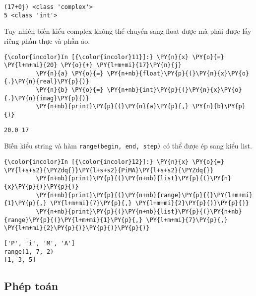     \begin{Verbatim}[commandchars=\\\{\}]
(17+0j) <class 'complex'>
5 <class 'int'>

    \end{Verbatim}

    Tuy nhiên biến kiểu complex không thể chuyển sang float được mà phải
được lấy riêng phần thực và phần ảo.

    
\begin{Verbatim}[commandchars=\\\{\}]
{\color{incolor}In [{\color{incolor}11}]:} \PY{n}{x} \PY{o}{=} \PY{l+m+mi}{20} \PY{o}{+} \PY{l+m+mi}{17}\PY{n}{j}
         \PY{n}{a} \PY{o}{=} \PY{n+nb}{float}\PY{p}{(}\PY{n}{x}\PY{o}{.}\PY{n}{real}\PY{p}{)}
         \PY{n}{b} \PY{o}{=} \PY{n+nb}{int}\PY{p}{(}\PY{n}{x}\PY{o}{.}\PY{n}{imag}\PY{p}{)}
         \PY{n+nb}{print}\PY{p}{(}\PY{n}{a}\PY{p}{,} \PY{n}{b}\PY{p}{)}
\end{Verbatim}
    

    \begin{Verbatim}[commandchars=\\\{\}]
20.0 17

    \end{Verbatim}

    Biến kiểu string và hàm \texttt{range(begin,\ end,\ step)} có thể được
ép sang kiểu list.

    
\begin{Verbatim}[commandchars=\\\{\}]
{\color{incolor}In [{\color{incolor}12}]:} \PY{n}{x} \PY{o}{=} \PY{l+s+s2}{\PYZdq{}}\PY{l+s+s2}{PiMA}\PY{l+s+s2}{\PYZdq{}}
         \PY{n+nb}{print}\PY{p}{(}\PY{n+nb}{list}\PY{p}{(}\PY{n}{x}\PY{p}{)}\PY{p}{)}
         \PY{n+nb}{print}\PY{p}{(}\PY{n+nb}{range}\PY{p}{(}\PY{l+m+mi}{1}\PY{p}{,} \PY{l+m+mi}{7}\PY{p}{,} \PY{l+m+mi}{2}\PY{p}{)}\PY{p}{)}
         \PY{n+nb}{print}\PY{p}{(}\PY{n+nb}{list}\PY{p}{(}\PY{n+nb}{range}\PY{p}{(}\PY{l+m+mi}{1}\PY{p}{,} \PY{l+m+mi}{7}\PY{p}{,} \PY{l+m+mi}{2}\PY{p}{)}\PY{p}{)}\PY{p}{)}
\end{Verbatim}
    

    \begin{Verbatim}[commandchars=\\\{\}]
['P', 'i', 'M', 'A']
range(1, 7, 2)
[1, 3, 5]

    \end{Verbatim}

    \subsection{Phép toán}\label{phuxe9p-touxe1n}

